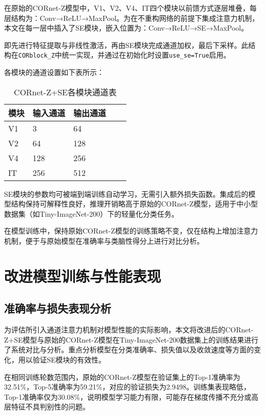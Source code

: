 在原始的CORnet-Z模型中，V1、V2、V4、IT四个模块以前馈方式逐层堆叠，每层结构为：Conv→ReLU→MaxPool。为在不重构网络的前提下集成注意力机制，本文在每一层中插入了SE模块，嵌入位置为：Conv→ReLU→SE→MaxPool。

即先进行特征提取与非线性激活，再由SE模块完成通道加权，最后下采样。此结构在\texttt{CORblock\_Z}中统一实现，并通过在初始化时设置\texttt{use\_se=True}启用。

各模块的通道设置如下表所示：

\begin{table}[htb]
	\centering
	\caption{CORnet-Z+SE各模块通道表}
	\label{tab:CORnet-Z+SE各模块通道表}
	\begin{tabular}{lllll}
		\hline
		模块& 输入通道 & 输出通道 \\
		\hline
		V1 & 3 & 64   \\
		V2 & 64 & 128   \\
		V4 & 128 & 256   \\
		IT & 256 & 512    \\
		\hline
	\end{tabular}
\end{table}

SE模块的参数均可被端到端训练自动学习，无需引入额外损失函数。集成后的模型结构保持可解释性良好，推理开销略高于原始的CORnet-Z模型，适用于中小型数据集（如Tiny-ImageNet-200）下的轻量化分类任务。

在模型训练中，保持原始CORnet-Z模型的训练策略不变，仅在结构上增加注意力机制，便于与原始模型在准确率与类脑性得分上进行对比分析。

\section{改进模型训练与性能表现}

\subsection{准确率与损失表现分析}

为评估所引入通道注意力机制对模型性能的实际影响，本文将改进后的CORnet-Z+SE模型与原始的CORnet-Z模型在Tiny-ImageNet-200数据集上的训练结果进行了系统对比与分析。重点分析模型在分类准确率、损失值以及收敛速度等方面的变化，用以验证SE模块的有效性。

在相同训练轮数范围内，原始的CORnet-Z模型在验证集上的Top-1准确率为32.51\%，Top-5准确率为59.21\%，对应的验证损失为2.9498。训练集表现略低，Top-1准确率仅为30.08\%，说明模型学习能力有限，可能存在梯度传播不充分或高层特征不具判别性的问题。

